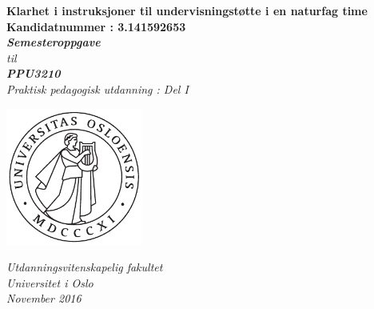 \documentclass[main.tex]{subfiles}
\begin{document}
\thispagestyle{empty}
\begin{center}        %
  \vspace{5mm}          %
  \LARGE
  \textbf{Klarhet i instruksjoner til undervisningst\o tte i en naturfag time} \\
  \Large
  \vspace{10mm}
  \large
  \textbf{Kandidatnummer : 3.141592653} \\
  \vspace{20mm}
  \Large
  {\bf{\textsl{Semesteroppgave}}} \\
  \textsl{til} \\
  \vspace{2mm}
  {\bf{\textsl{PPU3210}}} \\
  \vspace{5mm}
  {\large \textsl {Praktisk pedagogisk utdanning : Del I}}\\
  \vspace{10mm}
  \centerline{\includegraphics[width=45mm,height=45mm]{../figures/uiosegl.pdf}} 
  \vspace{8mm}
  \textsl{Utdanningsvitenskapelig fakultet} \\
  \textsl{Universitet i Oslo} \\
  \vspace{5mm}
  \large
  \textsl{November 2016} \\
  \vspace{2cm}


\end{center}
\end{document}
